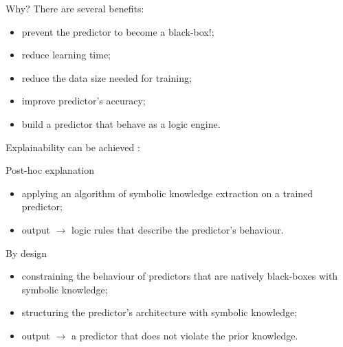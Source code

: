 \documentclass[presentation]{beamer}\mode<presentation>{\usetheme{AMSBolognaFC}}
\begin{document}
\begin{frame}[allowframebreaks]{\skilong}
    \framebreak
    
    \begin{block}{Why?}
        There are several benefits:
        \begin{itemize}
            \item prevent the predictor to become a black-box\alert{!};
            \item reduce learning time;
            \item reduce the data size needed for training;
            \item improve predictor's accuracy;
            \item build a predictor that behave as a logic engine.
        \end{itemize}
    \end{block}
    
    \framebreak
    
    Explainability can be achieved :
    \begin{block}{Post-hoc explanation}
        \begin{itemize}
            \item applying an algorithm of symbolic knowledge extraction on a trained predictor;
            \item output $\rightarrow$ logic rules that describe the predictor's behaviour.
        \end{itemize}    
    \end{block}
    
    \begin{block}{By design}
        \begin{itemize}
            \item constraining the behaviour of predictors that are natively black-boxes with symbolic knowledge;
            \item structuring the predictor's architecture with symbolic knowledge;
            \item output $\rightarrow$ a predictor that does not violate the prior knowledge.
        \end{itemize}
    \end{block}
    
    \framebreak
    

\end{frame}
\end{document}
